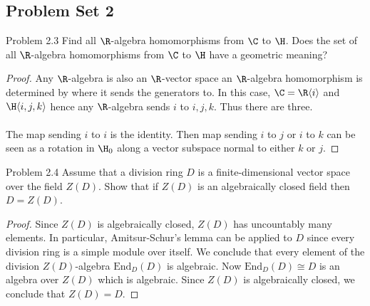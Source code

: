 \documentclass[a4paper]{article}
\begin{document}
\subsection{Problem Set 2}
\begin{ex}{Problem 2.3}{} Find all $\R$-algebra homomorphisms from $\C$ to $\H$. Does the set of all $\R$-algebra homomorphisms from $\C$ to $\H$ have a geometric meaning? \tcbline
\begin{proof}
Any $\R$-algebra is also an $\R$-vector space an $\R$-algebra homomorphism is determined by where it sends the generators to. In this case, $\C=\R\langle i\rangle$ and $\H\langle i,j,k\rangle$ hence any $\R$-algebra sends $i$ to $i,j,k$. Thus there are three. \\~\\

The map sending $i$ to $i$ is the identity. Then map sending $i$ to $j$ or $i$ to $k$ can be seen as a rotation in $\H_0$ along a vector subspace normal to either $k$ or $j$. 
\end{proof}
\end{ex}

\begin{ex}{Problem 2.4}{} Assume that a division ring $D$ is a finite-dimensional vector space over the field $Z(D)$. Show that if $Z(D)$ is an algebraically closed field then $D=Z(D)$. \tcbline
\begin{proof}
Since $Z(D)$ is algebraically closed, $Z(D)$ has uncountably many elements. In particular, Amitsur-Schur's lemma can be applied to $D$ since every division ring is a simple module over itself. We conclude that every element of the division $Z(D)$-algebra $\text{End}_D(D)$ is algebraic. Now $\text{End}_D(D)\cong D$ is an algebra over $Z(D)$ which is algebraic. Since $Z(D)$ is algebraically closed, we conclude that $Z(D)=D$. 
\end{proof}
\end{ex}
\end{document}
